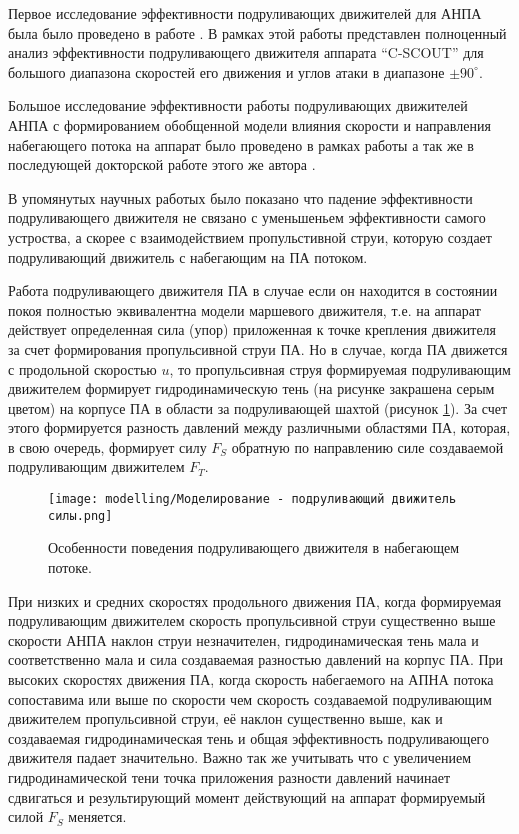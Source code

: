 Первое исследование эффективности подруливающих движителей для АНПА была было проведено в работе \cite{saunders2002effect}. 
В рамках этой работы представлен полноценный анализ эффективности подруливающего движителя аппарата ``C-SCOUT'' для большого диапазона скоростей его движения и углов атаки в диапазоне $\pm90^{\circ}$.

Большое исследование эффективности работы подруливающих движителей АНПА с формированием обобщенной модели влияния скорости и направления набегающего потока на аппарат было проведено в рамках работы \cite{palmer2008modelling} а так же в последующей докторской работе этого же автора \cite{palmer2009analysis}.

В упомянутых научных работых было показано что падение эффективности подруливающего движителя не связано с уменьшеньем эффективности самого устроства, а скорее с взаимодействием пропульстивной струи, которую создает подруливающий движитель с набегающим на ПА потоком.

Работа подруливающего движителя ПА в случае если он находится в состоянии покоя полностью эквивалентна модели маршевого движителя, т.е. на аппарат действует определенная сила (упор) приложенная к точке крепления движителя за счет формирования пропульсивной струи ПА.
Но в случае, когда ПА движется с продольной скоростью $u$, то пропульсивная струя формируемая подруливающим движителем формирует гидродинамическую тень (на рисунке закрашена серым цветом) на корпусе ПА в области за подруливающей шахтой (рисунок \ref{fig:modelling-tunnel}).
За счет этого формируется разность давлений между различными областями ПА, которая, в свою очередь, формирует силу $F_S$ обратную по направлению силе создаваемой подруливающим движителем $F_T$.

\begin{figure}[ht]
    \centering
    \texttt{[image: modelling/Моделирование - подруливающий движитель силы.png]}
    \caption{Особенности поведения подруливающего движителя в набегающем потоке.}
    \label{fig:modelling-tunnel}
\end{figure}

При низких и средних скоростях продольного движения ПА, когда формируемая подруливающим движителем скорость пропульсивной струи существенно выше скорости АНПА наклон струи незначителен, гидродинамическая тень мала и соответственно мала и сила создаваемая разностью давлений на корпус ПА.
При высоких скоростях движения ПА, когда скорость набегаемого на АПНА потока сопоставима или выше по скорости чем скорость создаваемой подруливающим движителем пропульсивной струи, её наклон существенно выше, как и создаваемая гидродинамическая тень и общая эффективность подруливающего движителя падает значительно.
Важно так же учитывать что с увеличением гидродинамической тени точка приложения разности давлений начинает сдвигаться и результирующий момент действующий на аппарат формируемый силой $F_S$ меняется.

